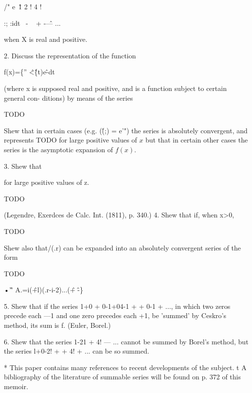 /" e~\^ 1 2 ! 4 !

:; :idt~ - ~ + -\^ — ...

when X is real and positive.

2. Discuss the representation of the function

f(x)=\{'' \^<\^\{t)e\^-dt

(where x is supposed real and positive, and is a function subject to
certain general con- ditions) by means of the series

TODO

Shew that in certain cases (e.g. (\^(;) = e'") the series is
absolutely convergent, and represents TODO for large positive values
of $x$ but that in certain other cases the series is the asymptotic
expansion of $f(x)$.

3. Shew that

for large positive values of z.

TODO

(Legendre, Exerdces de Calc. Int. (1811), p. 340.) 4. Shew that if,
when x>0,

TODO

Shew also that/(.r) can be expanded into an absolutely convergent
series of the form

TODO 

•'\^ ' A.=i(\^+l)(.r-i-2)...(\^ + \^-\}

5. Shew that if the series 1+0 + 0-1+04-1 + + 0-1 + ..., in which two
zeros precede each —1 and one zero precedes each +1, be 'summed' by
Ceskro's method, its sum is f. (Euler, Borel.)

6. Shew that the series 1-21 + 4! — ... cannot be summed by Borel's
method, but the series l+0-2! + + 4! + ... can be so summed.

* This paper contains many references to recent developments of the
subject. t A bibliography of the literature of summable series will be
found on p. 372 of this memoir.